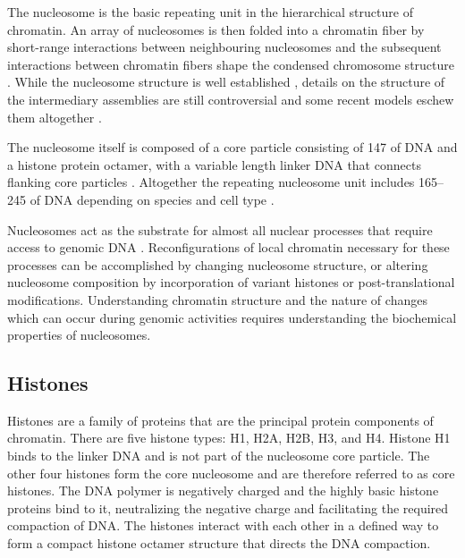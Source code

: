   The nucleosome is the
  basic repeating unit in the hierarchical structure of chromatin.
  An array of nucleosomes is then folded into a chromatin fiber by
  short-range interactions between neighbouring nucleosomes
  and the subsequent interactions between chromatin fibers shape the
  condensed chromosome structure .
  While the nucleosome
  structure is well established \citep{luger1997-28angstrom},
  details on the structure of the
  intermediary assemblies are still controversial and some recent models
  eschew them altogether
  \citep{fussner2011-no-30nm-fibre, luger2012-chromatin-review}.

  The nucleosome itself is composed of a core particle
  consisting of \SI{147}{\bp} of DNA and a histone protein octamer,
  with a variable length linker DNA that connects
  flanking core particles .
  Altogether the repeating nucleosome unit
  includes \SIrange{165}{245}{\bp} of DNA depending on species and
  cell type \citep{widom1992-linker-length}.

  Nucleosomes act as the substrate for almost all nuclear processes that
  require access to genomic DNA \citep{controlling-double-helix}.
  Reconfigurations of local chromatin necessary for these processes can
  be accomplished by changing nucleosome structure, or altering nucleosome
  composition by incorporation of variant histones or post-translational
  modifications.
  Understanding chromatin structure and the nature of changes which can
  occur during genomic activities
  requires understanding the biochemical properties of nucleosomes.

  \subsection{Histones}

    Histones are a family of proteins that are the principal protein components
    of chromatin.
    There are five histone types: H1, H2A, H2B, H3, and H4.
    Histone H1 binds to the linker DNA and is not part of the
    nucleosome core particle.
    The other four histones form the core
    nucleosome and are therefore referred to as core histones.
    The DNA polymer is negatively charged and the highly
    basic histone proteins bind to it, neutralizing the negative charge
    and facilitating the required compaction of DNA.
    The histones interact with each other in a defined way to form
    a compact histone octamer structure that directs the
    DNA compaction.

